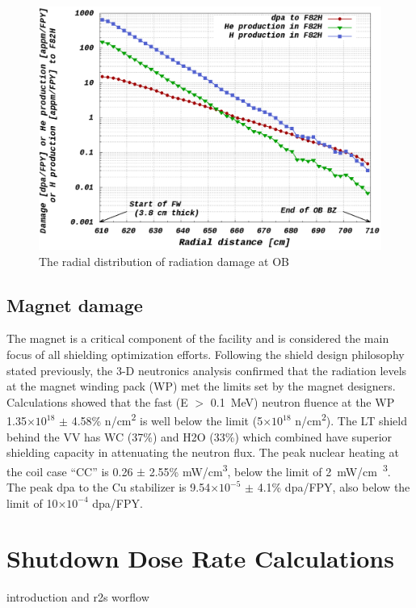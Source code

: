 \documentclass[12pt, letterpaper]{elsarticle}
\begin{document}
\begin{figure}[h!]
  \centering
  \includegraphics[scale=0.2]{../plots/radialdamage.png}
  \caption{The radial distribution of radiation damage at OB}
  \label{fig:Radial Damage}
\end{figure}

\subsection{Magnet damage} \label{Magnet damage}
\providecommand{\e}[1]{\ensuremath{\times 10^{#1}}}
The magnet is a critical component of the facility and is considered the main focus of all shielding optimization efforts. Following the shield design philosophy stated previously, the 3-D neutronics analysis confirmed that the radiation levels at the magnet winding pack (WP) met the limits set by the magnet designers. Calculations showed that the fast (E $>$ \SI{0.1}{MeV}) neutron fluence at the WP 1.35\e{18} $\pm$ 4.58\% n/cm\textsuperscript{2} is well below the limit (5\e{18} n/cm\textsuperscript{2}). The LT shield behind the VV has WC (37\%) and H2O (33\%) which combined have superior shielding capacity in attenuating the neutron flux. The peak nuclear heating at the coil case “CC” is 0.26 $\pm$ 2.55\% mW/cm\textsuperscript{3}, below the limit of \SI{2}{mW/cm\textsuperscript{3}}. The peak dpa to the Cu stabilizer is 9.54\e{-5} $\pm$ 4.1\% dpa/FPY, also below the limit of 10\e{-4} dpa/FPY.

\section{Shutdown Dose Rate Calculations} \label{Shutdown Dose Rate Calculations}
introduction and r2s worflow
\end{document}
